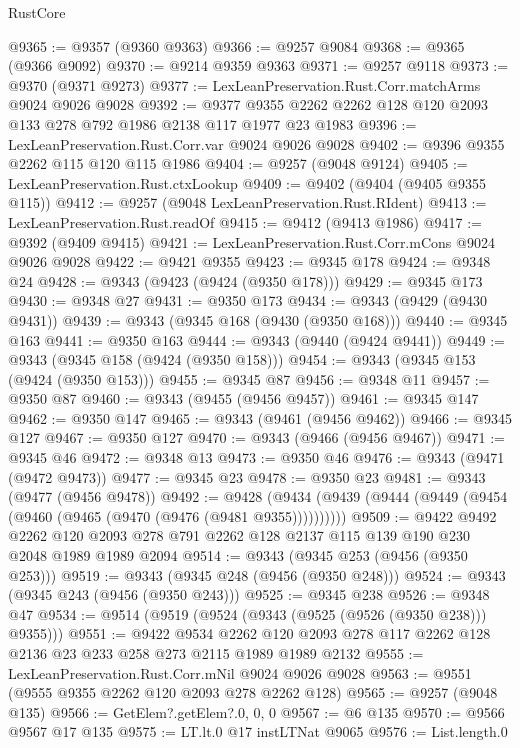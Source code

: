 \begin{lexlean}{RustCore}
\begin{coremodule}
@9365 := @9357 (@9360 @9363)
@9366 := @9257 @9084
@9368 := @9365 (@9366 @9092)
@9370 := @9214 @9359 @9363
@9371 := @9257 @9118
@9373 := @9370 (@9371 @9273)
@9377 := LexLeanPreservation.Rust.Corr.matchArms @9024 @9026 @9028
@9392 := @9377 @9355 @2262 @2262 @128 @120 @2093 @133 @278 @792 @1986 @2138 @117 @1977 @23 @1983
@9396 := LexLeanPreservation.Rust.Corr.var @9024 @9026 @9028
@9402 := @9396 @9355 @2262 @115 @120 @115 @1986
@9404 := @9257 (@9048 @9124)
@9405 := LexLeanPreservation.Rust.ctxLookup
@9409 := @9402 (@9404 (@9405 @9355 @115))
@9412 := @9257 (@9048 LexLeanPreservation.Rust.RIdent)
@9413 := LexLeanPreservation.Rust.readOf
@9415 := @9412 (@9413 @1986)
@9417 := @9392 (@9409 @9415)
@9421 := LexLeanPreservation.Rust.Corr.mCons @9024 @9026 @9028
@9422 := @9421 @9355
@9423 := @9345 @178
@9424 := @9348 @24
@9428 := @9343 (@9423 (@9424 (@9350 @178)))
@9429 := @9345 @173
@9430 := @9348 @27
@9431 := @9350 @173
@9434 := @9343 (@9429 (@9430 @9431))
@9439 := @9343 (@9345 @168 (@9430 (@9350 @168)))
@9440 := @9345 @163
@9441 := @9350 @163
@9444 := @9343 (@9440 (@9424 @9441))
@9449 := @9343 (@9345 @158 (@9424 (@9350 @158)))
@9454 := @9343 (@9345 @153 (@9424 (@9350 @153)))
@9455 := @9345 @87
@9456 := @9348 @11
@9457 := @9350 @87
@9460 := @9343 (@9455 (@9456 @9457))
@9461 := @9345 @147
@9462 := @9350 @147
@9465 := @9343 (@9461 (@9456 @9462))
@9466 := @9345 @127
@9467 := @9350 @127
@9470 := @9343 (@9466 (@9456 @9467))
@9471 := @9345 @46
@9472 := @9348 @13
@9473 := @9350 @46
@9476 := @9343 (@9471 (@9472 @9473))
@9477 := @9345 @23
@9478 := @9350 @23
@9481 := @9343 (@9477 (@9456 @9478))
@9492 := @9428 (@9434 (@9439 (@9444 (@9449 (@9454 (@9460 (@9465 (@9470 (@9476 (@9481 @9355))))))))))
@9509 := @9422
    @9492
    @2262
    @120
    @2093
    @278
    @791
    @2262
    @128
    @2137
    @115
    @139
    @190
    @230
    @2048
    @1989
    @1989
    @2094
@9514 := @9343 (@9345 @253 (@9456 (@9350 @253)))
@9519 := @9343 (@9345 @248 (@9456 (@9350 @248)))
@9524 := @9343 (@9345 @243 (@9456 (@9350 @243)))
@9525 := @9345 @238
@9526 := @9348 @47
@9534 := @9514 (@9519 (@9524 (@9343 (@9525 (@9526 (@9350 @238))) @9355)))
@9551 := @9422
    @9534
    @2262
    @120
    @2093
    @278
    @117
    @2262
    @128
    @2136
    @23
    @233
    @258
    @273
    @2115
    @1989
    @1989
    @2132
@9555 := LexLeanPreservation.Rust.Corr.mNil @9024 @9026 @9028
@9563 := @9551 (@9555 @9355 @2262 @120 @2093 @278 @2262 @128)
@9565 := @9257 (@9048 @135)
@9566 := GetElem?.getElem?.{0, 0, 0}
@9567 := @6 @135
@9570 := @9566 @9567 @17 @135
@9575 := LT.lt.{0} @17 instLTNat @9065
@9576 := List.length.{0}

\end{coremodule}
\end{lexlean}
